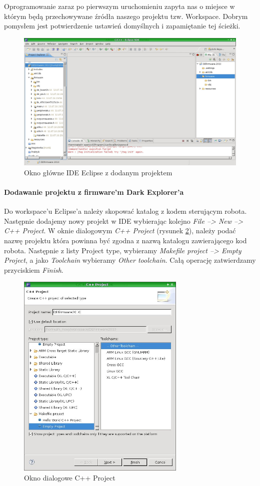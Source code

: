 Oprogramowanie zaraz po pierwszym uruchomieniu zapyta nas o miejsce w którym będą
przechowywane źródła naszego projektu tzw. Workspace. Dobrym pomysłem jest
potwierdzenie ustawień domyślnych i zapamiętanie tej ścieżki.

\begin{figure}
 \centering
 \includegraphics[width=150.0mm]{../images/Eclipse-MainWindow.jpg}
 \caption{Okno główne IDE Eclipse z dodanym projektem}
 \label{fig:Eclipse-MainWindow}
\end{figure}

\paragraph{Dodawanie projektu z firmware'm Dark Explorer'a}
Do workspace'u Eclipse'a należy skopować katalog z kodem sterującym robota.
Następnie dodajemy nowy projekt w IDE wybierając kolejno \textit{File --> New -->
C++ Project}. W oknie dialogowym \textit{C++ Project} (rysunek
\ref{fig:Eclipse-CPP-Project}), należy podać nazwę projektu która powinna być
zgodna z nazwą katalogu zawierającego kod robota. Następnie z listy Project type,
wybieramy \textit{Makefile project --> Empty Project}, a jako \textit{Toolchain}
wybieramy \textit{Other toolchain}. Całą operację zatwierdzamy przyciskiem
\textit{Finish}.

\begin{figure}
 \centering
 \includegraphics[height=100.0mm]{../images/Eclipse-CPP-Project.jpg}
 \caption{Okno dialogowe C++ Project}
 \label{fig:Eclipse-CPP-Project}
\end{figure}

